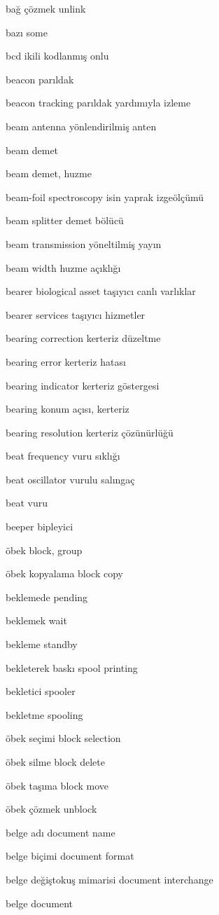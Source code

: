 \documentclass[12pt,fleqn]{article}\usepackage{../../common}
\begin{document}
bağ çözmek unlink

bazı some

bcd ikili kodlanmış onlu

beacon parıldak

beacon tracking parıldak yardımıyla izleme

beam antenna yönlendirilmiş anten

beam demet

beam demet, huzme

beam-foil spectroscopy isin yaprak izgeölçümü

beam splitter demet bölücü

beam transmission yöneltilmiş yayın

beam width huzme açıklığı

bearer biological asset taşıyıcı canlı varlıklar

bearer services taşıyıcı hizmetler

bearing correction kerteriz düzeltme

bearing error kerteriz hatası

bearing indicator kerteriz göstergesi

bearing konum açısı, kerteriz

bearing resolution kerteriz çözünürlüğü

beat frequency vuru sıklığı

beat oscillator vurulu salıngaç

beat vuru

beeper bipleyici

öbek block, group

öbek kopyalama block copy

beklemede pending

beklemek wait

bekleme standby

bekleterek baskı spool printing

bekletici spooler

bekletme spooling

öbek seçimi block selection

öbek silme block delete

öbek taşıma block move

öbek çözmek unblock

belge adı document name

belge biçimi document format

belge değiştokuş mimarisi document interchange

belge document
\end{document}
